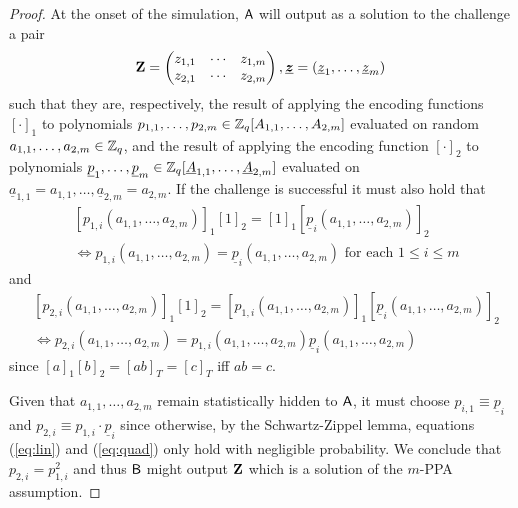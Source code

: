 \begin{proof}
%
%

At the onset of the simulation, $\mathsf{A}$ will output as a solution to the challenge a pair
$$
\mathbf{{Z}}=\left(\begin{matrix}z_{1,1}&\cdots&z_{1,m}\\z_{2,1}&\cdots&z_{2,m}\end{matrix}\right),\underline{{\boldsymbol{z}}} = (\underline{z}_1,\ldots,\underline{z}_m)
$$
such that they are, respectively, the result of applying the encoding functions $[\cdot]_1$ to polynomials $p_{1,1},\ldots,p_{2,m}\in\mathbb{Z}_q[A_{1,1},\ldots,\allowbreak A_{2,m}]$ evaluated on random $a_{1,1},\ldots,a_{2,m}\in\mathbb{Z}_q$, and the result of applying the encoding function $[\cdot]_2$ to polynomials $\underline{p}_{1},\ldots,\underline{p}_m\in\mathbb{Z}_q[\underline{A}_{1,1},\ldots,\underline{A}_{2,m}]$ evaluated on $\underline{a}_{1,1} = a_{1,1},\ldots,\underline{a}_{2,m} = a_{2,m}$.
If the challenge is successful it must also hold that
\begin{align}
&[p_{1,i}(a_{1,1},\ldots,a_{2,m})]_1[1]_2 = [1]_1[\underline{p}_i(a_{1,1},\ldots,a_{2,m})]_2 \nonumber\\
& \Longleftrightarrow 
p_{1,i}(a_{1,1},\ldots,a_{2,m}) = \underline{p}_i(a_{1,1},\ldots,a_{2,m}) \text{ for each }1\leq i \leq m
\label{eq:lin}
\end{align}
and
\begin{align}
	&[p_{2,i}(a_{1,1},\ldots,a_{2,m})]_1[1]_2 = [p_{1,i}(a_{1,1},\ldots,a_{2,m})]_1[\underline{p}_i(a_{1,1},\ldots,a_{2,m})]_2 \nonumber\\
	& \Longleftrightarrow 
	p_{2,i}(a_{1,1},\ldots,a_{2,m}) = p_{1,i}(a_{1,1},\ldots,a_{2,m})\underline{p}_i(a_{1,1},\ldots,a_{2,m})
	\label{eq:quad}
\end{align}
since $[a]_1[b]_2 = [ab]_T = [c]_T$ iff $ab=c$.

Given that $a_{1,1},\ldots,a_{2,m}$ remain statistically hidden to $\mathsf{A}$, it must choose $p_{i,1}\equiv \underline{p}_i$ and $p_{2,i}\equiv p_{1,i}\cdot \underline{p}_i$ since otherwise, by the Schwartz-Zippel lemma, equations (\ref{eq:lin}) and (\ref{eq:quad}) only hold with negligible probability. We conclude that $p_{2,i}=p^2_{1,i}$ and thus $\mathsf{B}$ might output $\mathbf{{Z}}$ which is a solution of the $m$-PPA assumption.
\end{proof}

